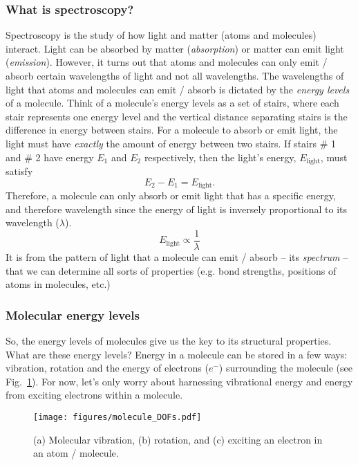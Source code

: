\documentclass[12pt]{article}
\begin{document}
\subsubsection{What is spectroscopy?}

Spectroscopy is the study of how light and matter (atoms and molecules) interact.
Light can be absorbed by matter (\textit{absorption}) or matter can emit light (\textit{emission}).
However, it turns out that atoms and molecules can only emit / absorb certain wavelengths of light and not all wavelengths.
The wavelengths of light that atoms and molecules can emit / absorb is dictated by the \textit{energy levels} of a molecule.
Think of a molecule's energy levels as a set of stairs, where each stair represents one energy level and the vertical distance separating stairs is the difference in energy between stairs.
For a molecule to absorb or emit light, the light must have \textit{exactly} the amount of energy between two stairs.
If stairs \# 1 and \# 2 have energy $E_1$ and $E_2$ respectively, then the light's energy, $E_{\text{light}}$, must satisfy
\begin{equation}
    E_2 - E_1 = E_{\text{light}}.
\end{equation}
Therefore, a molecule can only absorb or emit light that has a specific energy, and therefore wavelength since the energy of light is inversely proportional to its wavelength ($\lambda$).
\begin{equation}
    E_{\text{light}} \propto \frac{1}{\lambda}
\end{equation}
It is from the pattern of light that a molecule can emit / absorb -- its \textit{spectrum} -- that we can determine all sorts of properties (e.g. bond strengths, positions of atoms in molecules, etc.)

\subsubsection{Molecular energy levels} \label{sec:molec_energy_lvls}

So, the energy levels of molecules give us the key to its structural properties. What are these energy levels? Energy in a molecule can be stored in a few ways: vibration, rotation and the energy of electrons ($e^-$) surrounding the molecule (see Fig.~\ref{fig:DOFs}). For now, let's only worry about harnessing vibrational energy and energy from exciting electrons within a molecule.

\begin{figure}
    \begin{center}
        \texttt{[image: figures/molecule\_DOFs.pdf]}
    \end{center}
    \caption{
        (a) Molecular vibration, (b) rotation, and (c) exciting an electron in an atom / molecule.
    }
    \label{fig:DOFs}
\end{figure}
\end{document}
